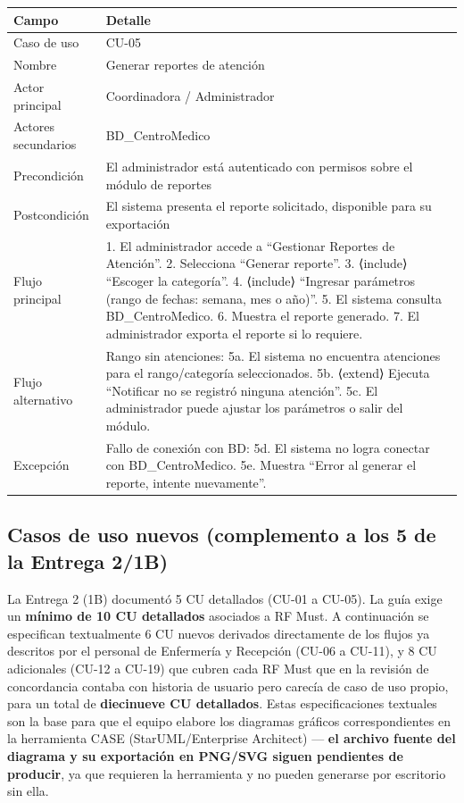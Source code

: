 \documentclass[11pt,a4paper]{article}
\begin{document}
	\begin{longtable}{p{} p{} }
		
		
		\toprule
		\textbf{Campo} &
		\textbf{Detalle}  \\
		\midrule
		\endhead
		
		Caso de uso & CU-05 \\
		Nombre & Generar reportes de atención \\
		Actor principal & Coordinadora / Administrador \\
		Actores secundarios & BD\_CentroMedico \\
		Precondición & El administrador está autenticado con permisos sobre el módulo de reportes \\
		Postcondición & El sistema presenta el reporte solicitado, disponible para su exportación \\
		Flujo principal & 1. El administrador accede a ``Gestionar Reportes de Atención''. 2. Selecciona ``Generar reporte''. 3. ⟨include⟩ ``Escoger la categoría''. 4. ⟨include⟩ ``Ingresar parámetros (rango de fechas: semana, mes o año)''. 5. El sistema consulta BD\_CentroMedico. 6. Muestra el reporte generado. 7. El administrador exporta el reporte si lo requiere. \\
		Flujo alternativo & Rango sin atenciones: 5a. El sistema no encuentra atenciones para el rango/categoría seleccionados. 5b. ⟨extend⟩ Ejecuta ``Notificar no se registró ninguna atención''. 5c. El administrador puede ajustar los parámetros o salir del módulo. \\
		Excepción & Fallo de conexión con BD: 5d. El sistema no logra conectar con BD\_CentroMedico. 5e. Muestra ``Error al generar el reporte, intente nuevamente''. \\
		
		\bottomrule
	\end{longtable}
	
	
	\subsection{ Casos de uso nuevos (complemento a los 5 de la Entrega 2/1B)}
	
	La Entrega 2 (1B) documentó 5 CU detallados (CU-01 a CU-05). La guía exige un \textbf{mínimo de 10 CU detallados} asociados a RF Must. A continuación se especifican textualmente 6 CU nuevos derivados directamente de los flujos ya descritos por el personal de Enfermería y Recepción (CU-06 a CU-11), y 8 CU adicionales (CU-12 a CU-19) que cubren cada RF Must que en la revisión de concordancia contaba con historia de usuario pero carecía de caso de uso propio, para un total de \textbf{diecinueve CU detallados}. Estas especificaciones textuales son la base para que el equipo elabore los diagramas gráficos correspondientes en la herramienta CASE (StarUML/Enterprise Architect) --- \textbf{el archivo fuente del diagrama y su exportación en PNG/SVG siguen pendientes de producir}, ya que requieren la herramienta y no pueden generarse por escritorio sin ella.
	
\end{document}
